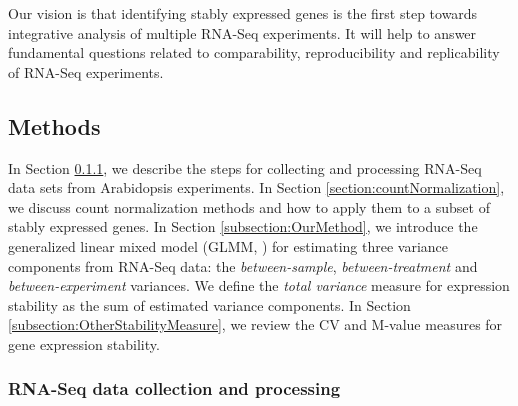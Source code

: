 Our vision is that identifying stably expressed genes is the first step
towards integrative analysis of multiple RNA-Seq experiments. It will help to
answer fundamental questions related to  comparability, reproducibility and
replicability of RNA-Seq experiments.

\subsection{Methods} 
\label{section:Methods}
In Section \ref{section:DataCollection}, we describe the steps for collecting
and processing RNA-Seq data sets from Arabidopsis experiments.  In Section
\ref{section:countNormalization}, we discuss count normalization methods and
how to apply them to a subset of stably expressed genes.
In Section \ref{subsection:OurMethod},  we introduce the generalized linear
mixed model (GLMM, \citealt{mcculloch2001generalized}) for estimating three
variance components from RNA-Seq data: the \textit{between-sample},
\textit{between-treatment} and \textit{between-experiment} variances.  We
define the \textit{total variance} measure for expression stability as the sum
of estimated variance components.  In Section
\ref{subsection:OtherStabilityMeasure}, we review the CV and M-value measures
for gene expression stability.



\subsubsection{RNA-Seq data collection and processing}\label{section:DataCollection} 


